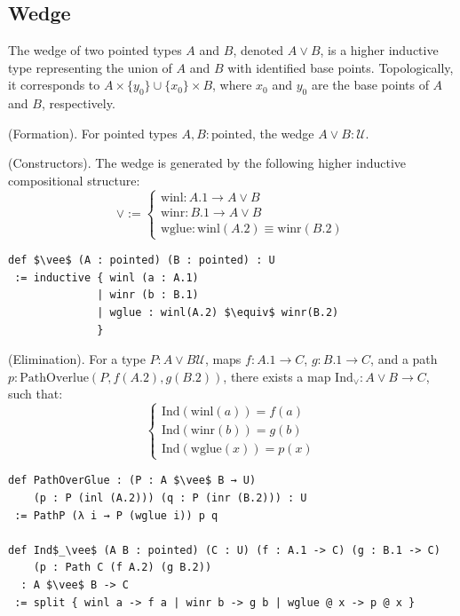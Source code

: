 \documentclass{article}
\begin{document}
\newpage
\subsection{Wedge}
The wedge of two pointed types \( A \) and \( B \), denoted \( A \vee B \),
is a higher inductive type representing the union of \( A \)
and \( B \) with identified base points. Topologically,
it corresponds to \( A \times \{ y_0 \} \cup \{ x_0 \} \times B \),
where \( x_0 \) and \( y_0 \) are the base points of \( A \) and \( B \), respectively.

\begin{definition} (Formation).
For pointed types \( A, B : \text{pointed} \), the wedge \( A \vee B : \mathcal{U} \).
\end{definition}

\begin{definition} (Constructors).
The wedge is generated by the following higher inductive compositional structure:
\[
\vee :=
\begin{cases}
\text{winl} : A.1 \to A \vee B \\
\text{winr} : B.1 \to A \vee B \\
\text{wglue} : \text{winl} (A.2) \equiv \text{winr}(B.2)
\end{cases}
\]
\begin{lstlisting}[mathescape=true]
def $\vee$ (A : pointed) (B : pointed) : U
 := inductive { winl (a : A.1)
              | winr (b : B.1)
              | wglue : winl(A.2) $\equiv$ winr(B.2)
              }
\end{lstlisting}
\end{definition}

\begin{theorem} (Elimination).
For a type \( P : A \vee B \mathcal{U} \), maps \( f : A.1 \to C \),
\( g : B.1 \to C \), and a path \( p : \text{PathOverlue}(P,f(A.2),g (B.2)) \),
there exists a map \( \text{Ind}_\vee : A \vee B \to C \), such that:
\[
\begin{cases}
\text{Ind}(\text{winl}(a)) = f(a) \\
\text{Ind}(\text{winr}(b)) = g(b) \\
\text{Ind}(\text{wglue}(x)) = p(x)
\end{cases}
\]
\begin{lstlisting}[mathescape=true]
def PathOverGlue : (P : A $\vee$ B → U)
    (p : P (inl (A.2))) (q : P (inr (B.2))) : U
 := PathP (λ i → P (wglue i)) p q

def Ind$_\vee$ (A B : pointed) (C : U) (f : A.1 -> C) (g : B.1 -> C)
    (p : Path C (f A.2) (g B.2))
  : A $\vee$ B -> C
 := split { winl a -> f a | winr b -> g b | wglue @ x -> p @ x }
\end{lstlisting}
\end{theorem}
\end{document}
